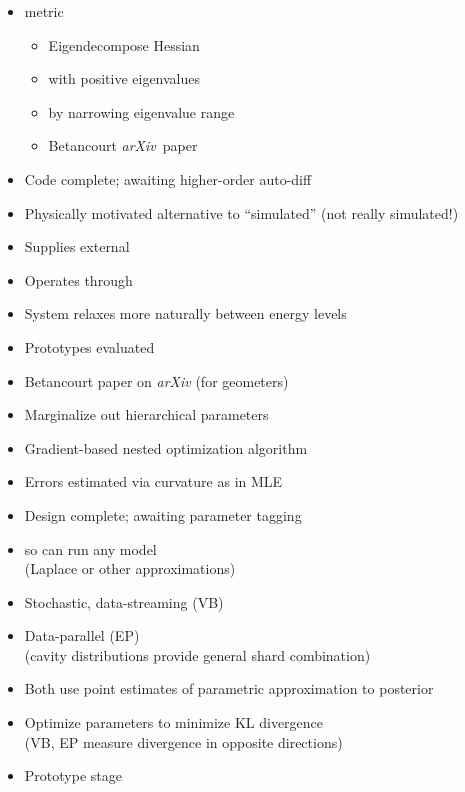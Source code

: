 \documentclass[10pt]{report}
\newcommand{\sld}[1]{\newpage{\noindent\LARGE \ \ \
    \textcolor{MidnightBlue}{\bfseries #1}}\vspace*{4pt}}
\newcommand{\myemph}[1]{{\color{MidnightBlue}{\bfseries #1}}}
\begin{document}
\sld{Riemannian Manifold HMC}
\begin{itemize}
\item \myemph{SoftAbs} metric
\vspace*{-4pt}
\begin{itemize}\footnotesize
\item Eigendecompose Hessian
\item \myemph{positive definite} with positive eigenvalues
\item \myemph{condition} by narrowing eigenvalue range
\item Betancourt {\slshape arXiv}\ paper
\end{itemize}
\vfill
\item Code complete; awaiting higher-order auto-diff
\end{itemize}

\sld{Thermodynamic Sampler}
\begin{itemize}
\item Physically motivated alternative to ``simulated''
  \myemph{annealing and tempering} (not really simulated!)
\item Supplies external \myemph{heat bath}
\item Operates through \myemph{contact manifold}
\item System relaxes more naturally between energy levels
\vfill
\item Prototypes evaluated
\item Betancourt paper on {\slshape arXiv} (for geometers)
\end{itemize}

\sld{Marginal Maximum Likelihood}
\begin{itemize}
\item Marginalize out hierarchical parameters
\item Gradient-based nested optimization algorithm
\item Errors estimated via curvature as in MLE
\vfill
\item Design complete; awaiting parameter tagging
\end{itemize}

\sld{``Black Box'' VB and EP}
\begin{itemize}
\item \myemph{Black box} so can run any model
\\
{\footnotesize (Laplace or other approximations)}
\item Stochastic, data-streaming \myemph{variational Bayes} (VB)
\item Data-parallel \myemph{expectation propagation} (EP)
\\ {\footnotesize (cavity distributions provide general shard combination)}
\item Both use point estimates of parametric approximation to posterior
\item Optimize parameters to minimize KL divergence
\\
{\footnotesize (VB, EP measure divergence in opposite directions)}
\vfill
\item Prototype stage
\end{itemize}
\end{document}
